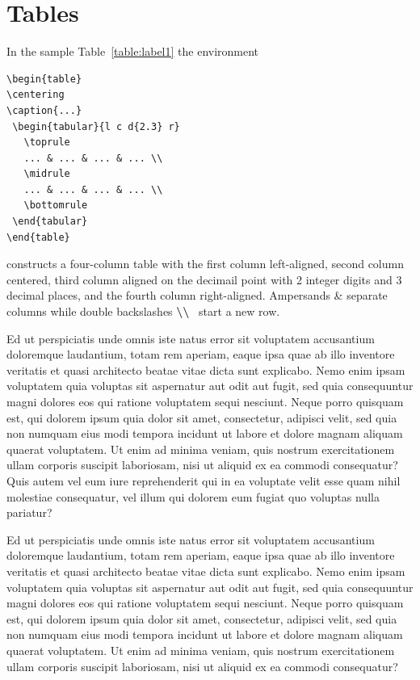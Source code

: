 \documentclass[10pt,a4paper,twocolumn]{article}
\begin{document}
\section{Tables}
In the sample Table~\ref{table:label1} the environment
\begin{verbatim} 
\begin{table}
\centering 
\caption{...}
 \begin{tabular}{l c d{2.3} r}
   \toprule
   ... & ... & ... & ... \\
   \midrule
   ... & ... & ... & ... \\
   \bottomrule
 \end{tabular}
\end{table}
\end{verbatim} 
constructs a four-column table with the first column left-aligned, second column centered, third column aligned on the decimail point with 2 integer digits and 3 decimal places, and the fourth column right-aligned. Ampersands {\ttfamily \&} separate columns while double backslashes \textbf{\textbackslash\textbackslash} \ start a new row.

Ed ut perspiciatis unde omnis iste natus error sit voluptatem accusantium doloremque laudantium, totam rem aperiam, eaque ipsa quae ab illo inventore veritatis et quasi architecto beatae vitae dicta sunt explicabo. Nemo enim ipsam voluptatem quia voluptas sit aspernatur aut odit aut fugit, sed quia consequuntur magni dolores eos qui ratione voluptatem sequi nesciunt. Neque porro quisquam est, qui dolorem ipsum quia dolor sit amet, consectetur, adipisci velit, sed quia non numquam eius modi tempora incidunt ut labore et dolore magnam aliquam quaerat voluptatem. Ut enim ad minima veniam, quis nostrum exercitationem ullam corporis suscipit laboriosam, nisi ut aliquid ex ea commodi consequatur? Quis autem vel eum iure reprehenderit qui in ea voluptate velit esse quam nihil molestiae consequatur, vel illum qui dolorem eum fugiat quo voluptas nulla pariatur?


Ed ut perspiciatis unde omnis iste natus error sit voluptatem accusantium doloremque laudantium, totam rem aperiam, eaque ipsa quae ab illo inventore veritatis et quasi architecto beatae vitae dicta sunt explicabo. Nemo enim ipsam voluptatem quia voluptas sit aspernatur aut odit aut fugit, sed quia consequuntur magni dolores eos qui ratione voluptatem sequi nesciunt. Neque porro quisquam est, qui dolorem ipsum quia dolor sit amet, consectetur, adipisci velit, sed quia non numquam eius modi tempora incidunt ut labore et dolore magnam aliquam quaerat voluptatem. Ut enim ad minima veniam, quis nostrum exercitationem ullam corporis suscipit laboriosam, nisi ut aliquid ex ea commodi consequatur? 
\end{document}
